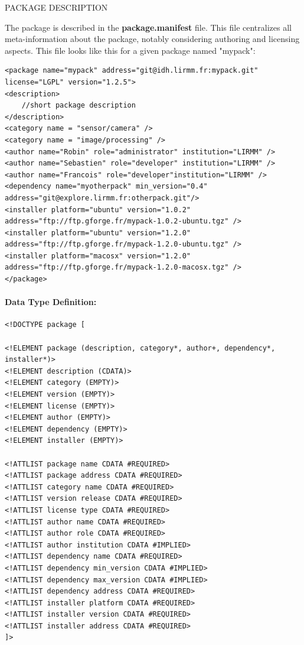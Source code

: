 \documentclass[12pt,a4paper]{article}
\begin{document}
PACKAGE DESCRIPTION

The package is described in the \textbf{package.manifest} file. This file centralizes all meta-information about the package, notably considering authoring and licensing aspects. This file looks like this for a given package named "mypack":
\begin{verbatim}
<package name="mypack" address="git@idh.lirmm.fr:mypack.git"
license="LGPL" version="1.2.5">
<description>
	//short package description
</description>
<category name = "sensor/camera" />
<category name = "image/processing" />
<author name="Robin" role="administrator" institution="LIRMM" />
<author name="Sebastien" role="developer" institution="LIRMM" />    
<author name="Francois" role="developer"institution="LIRMM" />
<dependency name="myotherpack" min_version="0.4"
address="git@explore.lirmm.fr:otherpack.git"/>
<installer platform="ubuntu" version="1.0.2"
address="ftp://ftp.gforge.fr/mypack-1.0.2-ubuntu.tgz" />
<installer platform="ubuntu" version="1.2.0" 
address="ftp://ftp.gforge.fr/mypack-1.2.0-ubuntu.tgz" />
<installer platform="macosx" version="1.2.0" 
address="ftp://ftp.gforge.fr/mypack-1.2.0-macosx.tgz" />
</package>
\end{verbatim}

\paragraph{Data Type Definition:}
\begin{verbatim}
<!DOCTYPE package [

<!ELEMENT package (description, category*, author+, dependency*, 
installer*)>
<!ELEMENT description (CDATA)>
<!ELEMENT category (EMPTY)>
<!ELEMENT version (EMPTY)>
<!ELEMENT license (EMPTY)>
<!ELEMENT author (EMPTY)>
<!ELEMENT dependency (EMPTY)>
<!ELEMENT installer (EMPTY)>

<!ATTLIST package name CDATA #REQUIRED>
<!ATTLIST package address CDATA #REQUIRED>
<!ATTLIST category name CDATA #REQUIRED>
<!ATTLIST version release CDATA #REQUIRED>
<!ATTLIST license type CDATA #REQUIRED>
<!ATTLIST author name CDATA #REQUIRED>
<!ATTLIST author role CDATA #REQUIRED>
<!ATTLIST author institution CDATA #IMPLIED>
<!ATTLIST dependency name CDATA #REQUIRED>
<!ATTLIST dependency min_version CDATA #IMPLIED>
<!ATTLIST dependency max_version CDATA #IMPLIED>
<!ATTLIST dependency address CDATA #REQUIRED>
<!ATTLIST installer platform CDATA #REQUIRED>
<!ATTLIST installer version CDATA #REQUIRED>
<!ATTLIST installer address CDATA #REQUIRED>
]>
\end{verbatim}
\end{document}
